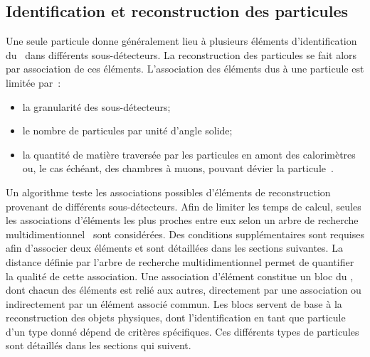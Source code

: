 \subsection{Identification et reconstruction des particules}\label{chapter-LHC-section-evt_reco-subsec-ptc_ID}
Une seule particule donne généralement lieu à plusieurs éléments d'identification du \PF\ dans différents sous-détecteurs.
La reconstruction des particules se fait alors par association de ces éléments.
L'association des éléments dus à une particule est limitée par~\cite{particle-flow}:
\begin{itemize}
\item la granularité des sous-détecteurs;
\item le nombre de particules par unité d'angle solide;
\item la quantité de matière traversée par les particules en amont des calorimètres ou, le cas échéant, des chambres à muons, pouvant dévier la particule~\cite{moliere_scat_1,moliere_scat_2}.
\end{itemize}
\par Un algorithme teste les associations possibles d'éléments de reconstruction provenant de différents sous-détecteurs.
Afin de limiter les temps de calcul, seules les associations d'éléments les plus proches entre eux selon un arbre de recherche multidimentionnel~\cite{bentley} sont considérées.
Des conditions supplémentaires sont requises afin d'associer deux éléments et sont détaillées dans les sections suivantes.
La distance définie par l'arbre de recherche multidimentionnel permet de quantifier la qualité de cette association.
Une association d'élément constitue un \og bloc \fg{} du \PF,
dont chacun des éléments est relié aux autres, directement par une association ou indirectement par un élément associé commun.
Les blocs servent de base à la reconstruction des objets physiques, dont l'identification en tant que particule d'un type donné dépend de critères spécifiques.
Ces différents types de particules sont détaillés dans les sections qui suivent.
